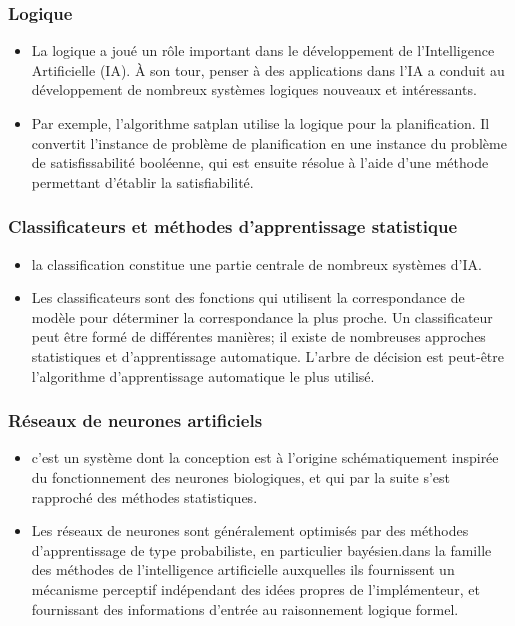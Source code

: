 \documentclass{beamer}
\begin{document}
	
	\begin{frame}[fragile]
		\frametitle{Logique}
		\begin{itemize}
		    \item La logique a joué un rôle important dans le développement de l'Intelligence Artificielle (IA). À son tour, penser à des applications dans l'IA a conduit au développement de nombreux systèmes logiques nouveaux et intéressants.
		    \item Par exemple, l'algorithme satplan utilise la logique pour la planification. Il convertit l'instance de problème de planification en une instance du problème de satisfissabilité booléenne, qui est ensuite résolue à l'aide d'une méthode permettant d'établir la satisfiabilité.
		\end{itemize} %
	\end{frame}
	
	
	\begin{frame}[fragile]
		\frametitle{Classificateurs et méthodes d'apprentissage statistique}
		\begin{itemize}
			\item la classification constitue une partie centrale de nombreux systèmes d'IA. 
             \item Les classificateurs sont des fonctions qui utilisent la correspondance de modèle pour déterminer la correspondance la plus proche. Un classificateur peut être formé de différentes manières; il existe de nombreuses approches statistiques et d'apprentissage automatique. L'arbre de décision est peut-être l'algorithme d'apprentissage automatique le plus utilisé.
		\end{itemize} %
	\end{frame}
	
	
	\begin{frame}[fragile]
		\frametitle{Réseaux de neurones artificiels}
		\begin{itemize}
		    \item  c'est un système dont la conception est à l'origine schématiquement inspirée du fonctionnement des neurones biologiques, et qui par la suite s'est rapproché des méthodes statistiques.
		    \item Les réseaux de neurones sont généralement optimisés par des méthodes d’apprentissage de type probabiliste, en particulier bayésien.dans la famille des méthodes de l’intelligence artificielle auxquelles ils fournissent un mécanisme perceptif indépendant des idées propres de l'implémenteur, et fournissant des informations d'entrée au raisonnement logique formel.
		\end{itemize}  %
		
	\end{frame}
\end{document}
